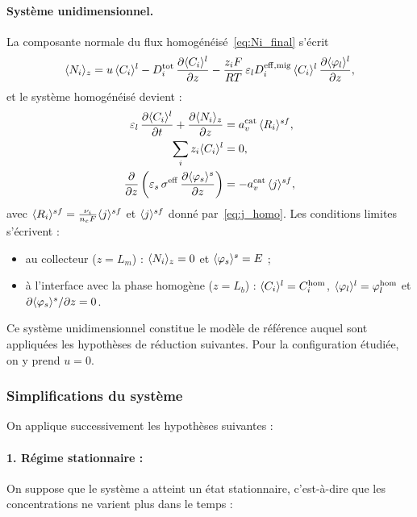 \paragraph{Système unidimensionnel.} La composante normale du flux
homogénéisé~\eqref{eq:Ni_final} s'écrit
\begin{equation}
\langle N_i \rangle_z
= u\,\langle C_i \rangle^l
- D_i^{\mathrm{tot}}\,\frac{\partial \langle C_i \rangle^l}{\partial z}
- \frac{z_iF}{RT}\,\varepsilon_l D_i^{\mathrm{eff,mig}}\,\langle C_i \rangle^l\,
\frac{\partial \langle \varphi_l \rangle^l}{\partial z} ,
\label{eq:proj_flux}
\end{equation}
et le système homogénéisé devient :
\begin{align}
\varepsilon_l\,\frac{\partial \langle C_i \rangle^l}{\partial t}
+ \frac{\partial \langle N_i \rangle_z}{\partial z}
&= a_v^{\mathrm{cat}}\,\langle R_i \rangle^{sf},
\label{eq:proj_bilan}\\
\sum_i z_i\langle C_i \rangle^l &= 0,
\label{eq:proj_EN}\\
\frac{\partial}{\partial z}\left(\varepsilon_s\,\sigma^{\mathrm{eff}}\,
\frac{\partial \langle \varphi_s \rangle^s}{\partial z}\right)
&= -a_v^{\mathrm{cat}}\,\langle j \rangle^{sf},
\label{eq:proj_ohm}
\end{align}
avec $\langle R_i \rangle^{sf} = \frac{\nu_i}{n_eF}\langle j \rangle^{sf}$ et $\langle j \rangle^{sf}$
donné par~\eqref{eq:j_homo}. Les conditions limites s'écrivent :
\begin{itemize}
    \item au collecteur ($z = L_m$) : $\langle N_i \rangle_z = 0$ et
    $\langle \varphi_s \rangle^s = E$ ;
    \item à l'interface avec la phase homogène ($z = L_b$) :
    $\langle C_i \rangle^l = C_i^{\mathrm{hom}}$,
    $\langle \varphi_l \rangle^l = \varphi_l^{\mathrm{hom}}$ et
    $\partial\langle \varphi_s \rangle^s/\partial z = 0$.
\end{itemize}
Ce système unidimensionnel constitue le modèle de référence auquel sont
appliquées les hypothèses de réduction suivantes. Pour la configuration
étudiée, on y prend $u = 0$.

\subsubsection*{Simplifications du système}

On applique successivement les hypothèses suivantes :

\paragraph{1. Régime stationnaire :}
On suppose que le système a atteint un état stationnaire,
c'est-à-dire que les concentrations ne varient plus dans le temps :

